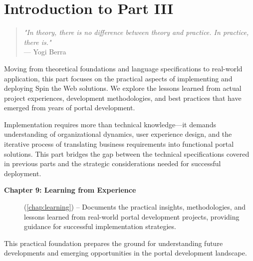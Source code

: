 
\chapter*{Introduction to Part III}
\label{part:implementation}

\begin{quote}
\textit{"In theory, there is no difference between theory and practice. In practice, there is."} \\
— Yogi Berra
\end{quote}

Moving from theoretical foundations and language specifications to real-world application, this part focuses on the practical aspects of implementing and deploying Spin the Web solutions. We explore the lessons learned from actual project experiences, development methodologies, and best practices that have emerged from years of portal development.

Implementation requires more than technical knowledge—it demands understanding of organizational dynamics, user experience design, and the iterative process of translating business requirements into functional portal solutions. This part bridges the gap between the technical specifications covered in previous parts and the strategic considerations needed for successful deployment.

\begin{description}
\item[\textbf{Chapter 9: Learning from Experience}] (\cref{chap:learning}) -- Documents the practical insights, methodologies, and lessons learned from real-world portal development projects, providing guidance for successful implementation strategies.
\end{description}

This practical foundation prepares the ground for understanding future developments and emerging opportunities in the portal development landscape.
